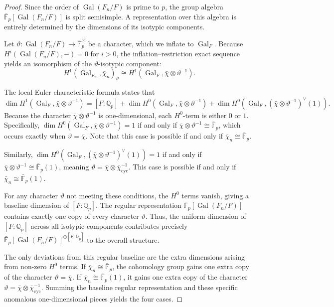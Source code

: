 \documentclass[11pt]{amsart}
\theoremstyle{definition}
\newcommand{\Q}{\mathbb{Q}}
\newcommand{\F}{\mathbb{F}}
\newcommand{\cyc}{{\operatorname{cyc}}}
\DeclareMathOperator{\Gal}{Gal}
\begin{document}
\begin{proof}
Since the order of $\Gal(F_n/F)$ is prime to $p$, the group algebra
$\bar{\F}_p[\Gal(F_n/F)]$ is split semisimple. A representation over this
algebra is entirely determined by the dimensions of its isotypic
components.

Let $\vartheta: \Gal(F_n/F) \rightarrow\bar{\F}_p^\times$ be a character,
which we inflate to $\Gal_F$. Because $H^i(\Gal(F_n/F), -) = 0$ for $i > 0$,
the inflation--restriction exact sequence yields an isomorphism of the
$\vartheta$-isotypic component:
\[
H^1(\Gal_{F_n},\bar\chi_n)_\vartheta
\cong
H^1(\Gal_F,\bar\chi\otimes\vartheta^{-1}).
\]

The local Euler characteristic formula states that
\[
\dim H^1(\Gal_F,\bar\chi\otimes\vartheta^{-1})
=
[F:\Q_p]
+
\dim H^0(\Gal_F,\bar\chi\otimes\vartheta^{-1})
+
\dim H^0(\Gal_F,(\bar\chi\otimes\vartheta^{-1})^\vee(1)).
\]
Because the character $\bar\chi\otimes\vartheta^{-1}$ is one-dimensional,
each $H^0$-term is either $0$ or $1$. Specifically,
$\dim H^0(\Gal_F,\bar\chi\otimes\vartheta^{-1}) = 1$ if and only if
$\bar\chi\otimes\vartheta^{-1} \cong \bar{\F}_p$, which occurs exactly
when $\vartheta = \bar\chi$. Note that this case is possible if and only
if $\bar\chi_n \cong \bar{\F}_p$.

Similarly, $\dim H^0(\Gal_F,(\bar\chi\otimes\vartheta^{-1})^\vee(1)) = 1$
if and only if $\bar\chi\otimes\vartheta^{-1} \cong \bar{\F}_p(1)$, meaning
$\vartheta = \bar\chi\otimes\bar\chi_{\cyc}^{-1}$. This case is possible
if and only if $\bar\chi_n \cong \bar{\F}_p(1)$.

For any character $\vartheta$ not meeting these conditions, the $H^0$
terms vanish, giving a baseline dimension of $[F:\Q_p]$. The regular
representation $\bar{\F}_p[\Gal(F_n/F)]$ contains exactly one copy of
every character $\vartheta$. Thus, the uniform dimension of $[F:\Q_p]$
across all isotypic components contributes precisely
$\bar{\F}_p[\Gal(F_n/F)]^{\oplus [F:\Q_p]}$ to the overall structure.

The only deviations from this regular baseline are the extra dimensions
arising from non-zero $H^0$ terms. If $\bar\chi_n \cong \bar{\F}_p$, the
cohomology group gains one extra copy of the character $\vartheta = \bar\chi$.
If $\bar\chi_n \cong \bar{\F}_p(1)$, it gains one extra copy of the
character $\vartheta = \bar\chi\otimes\bar\chi_{\cyc}^{-1}$. Summing the
baseline regular representation and these specific anomalous
one-dimensional pieces yields the four cases.
\end{proof}
\end{document}

